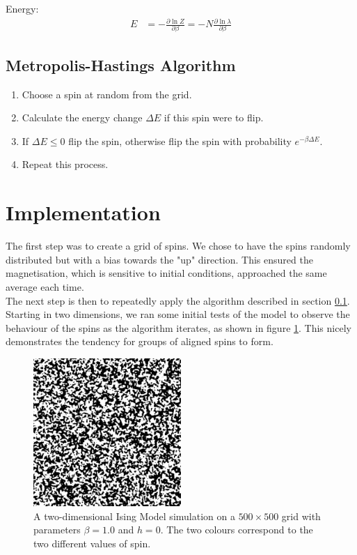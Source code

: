 \documentclass[11pt]{article}
\begin{document}
	Energy:
	\begin{equation}
		\begin{split}
			E &= - \frac{\partial \ln{Z}}{\partial \beta} = -N\frac{\partial \ln{\lambda}}{\partial \beta}
		\end{split}
	\end{equation}

	\subsection{Metropolis-Hastings Algorithm}
	\label{metropolis_algorithm}
	
	\begin{enumerate}
		\item Choose a spin at random from the grid.
		\item Calculate the energy change $\Delta E$ if this spin were to flip.
		\item If $\Delta E \leq 0$ flip the spin, otherwise flip the spin with probability $e^{-\beta\Delta E}$.
		\item Repeat this process.
	\end{enumerate}
	
	\section{Implementation}
	
	The first step was to create a grid of spins. We chose to have the spins randomly distributed but with a bias towards the "up" direction. This ensured the magnetisation, which is sensitive to initial conditions, approached the same average each time.\\
	
	The next step is then to repeatedly apply the algorithm described in section \ref{metropolis_algorithm}. Starting in two dimensions, we ran some initial tests of the model to observe the behaviour of the spins as the algorithm iterates, as shown in figure \ref{fig:ising_grid}. This nicely demonstrates the tendency for groups of aligned spins to form.
	\begin{figure}[H]
		\begin{center}
			\includegraphics[width=0.5\textwidth]{./img/ising-simulation.png}
		\end{center}
		\caption{A two-dimensional Ising Model simulation on a $500\times 500$ grid with parameters $\beta = 1.0$ and $h = 0$. The two colours correspond to the two different values of spin.}
		\label{fig:ising_grid}
	\end{figure}
	
\end{document}
